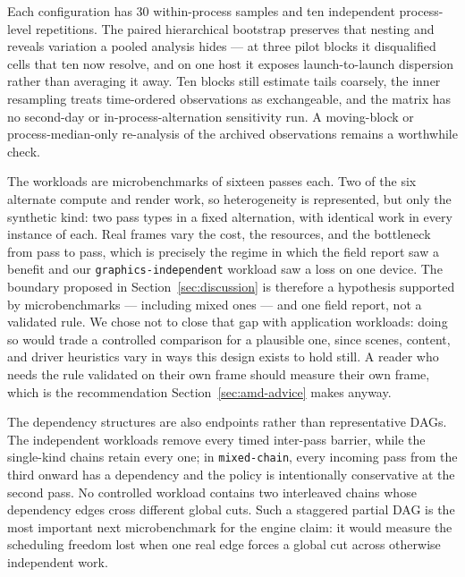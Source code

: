 \documentclass[10pt,twocolumn]{article}
\begin{document}
Each configuration has 30 within-process samples and ten independent
process-level repetitions. The paired hierarchical bootstrap preserves that
nesting and reveals variation a pooled analysis hides --- at three pilot
blocks it disqualified cells that ten now resolve, and on one host it
exposes launch-to-launch dispersion rather than averaging it away. Ten
blocks still estimate tails coarsely, the inner resampling treats
time-ordered observations as exchangeable, and the matrix has no second-day
or in-process-alternation sensitivity run. A moving-block or
process-median-only re-analysis of the archived observations remains a
worthwhile check.

The workloads are microbenchmarks of sixteen passes each. Two of the six
alternate compute and render work, so heterogeneity is represented, but only
the synthetic kind: two pass types in a fixed alternation, with identical work
in every instance of each. Real frames vary the cost, the resources, and the
bottleneck from pass to pass, which is precisely the regime in which the field
report saw a benefit and our \texttt{graphics-independent} workload saw a loss
on one device. The boundary proposed in Section~\ref{sec:discussion} is
therefore a hypothesis supported by microbenchmarks --- including mixed ones ---
and one field report, not a validated rule. We chose not to close that gap with
application workloads: doing so would trade a controlled comparison for a
plausible one, since scenes, content, and driver heuristics vary in ways this
design exists to hold still. A reader who needs the rule validated on their own
frame should measure their own frame, which is the recommendation
Section~\ref{sec:amd-advice} makes anyway.

The dependency structures are also endpoints rather than representative DAGs.
The independent workloads remove every timed inter-pass barrier, while the
single-kind chains retain every one; in \texttt{mixed-chain}, every incoming
pass from the third onward has a dependency and the policy is intentionally
conservative at the second pass. No controlled workload contains two
interleaved chains whose dependency edges cross different global cuts. Such a
staggered partial DAG is the most important next microbenchmark for the engine
claim: it would measure the scheduling freedom lost when one real edge forces
a global cut across otherwise independent work.
\end{document}
